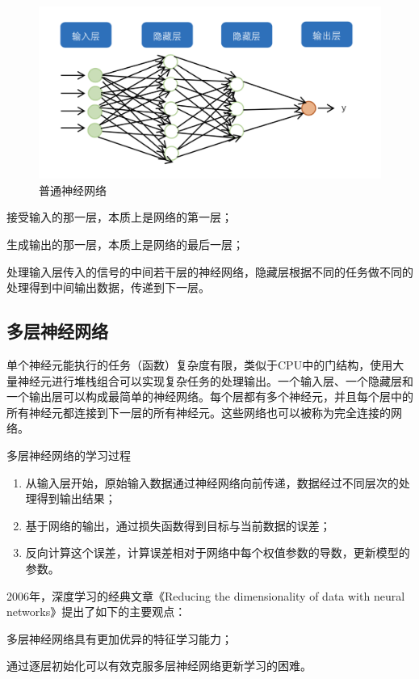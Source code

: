 \begin{figure}
  \centering
  \includegraphics[scale=0.5]{static/network.png}
  \caption{普通神经网络}
\end{figure}

\begin{defn}[输入层]
  接受输入的那一层，本质上是网络的第一层；
\end{defn}
\begin{defn}[输出层]
  生成输出的那一层，本质上是网络的最后一层；
\end{defn}
\begin{defn}[隐藏层]
  处理输入层传入的信号的中间若干层的神经网络，隐藏层根据不同的任务做不同的处理得到中间输出数据，传递到下一层。
\end{defn}
\subsection{多层神经网络}
\begin{defn}
  单个神经元能执行的任务（函数）复杂度有限，类似于CPU中的门结构，使用大量神经元进行堆栈组合可以实现复杂任务的处理输出。一个输入层、一个隐藏层和一个输出层可以构成最简单的神经网络。每个层都有多个神经元，并且每个层中的所有神经元都连接到下一层的所有神经元。这些网络也可以被称为完全连接的网络。 
\end{defn}
多层神经网络的学习过程
\begin{enumerate}
  \item 从输入层开始，原始输入数据通过神经网络向前传递，数据经过不同层次的处理得到输出结果；
  \item 基于网络的输出，通过损失函数得到目标与当前数据的误差；
  \item 反向计算这个误差，计算误差相对于网络中每个权值参数的导数，更新模型的参数。
\end{enumerate}
2006年，深度学习的经典文章《Reducing the dimensionality of data with neural networks》\cite{hinton2006reducing}提出了如下的主要观点：
\begin{enumerate*}
  \item 多层神经网络具有更加优异的特征学习能力；
  \item 通过逐层初始化可以有效克服多层神经网络更新学习的困难。
\end{enumerate*}


